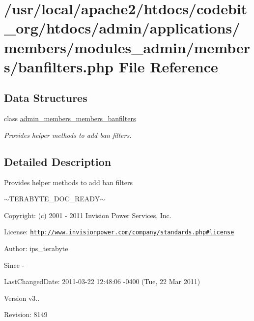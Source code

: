 \hypertarget{banfilters_8php}{\section{/usr/local/apache2/htdocs/codebit\-\_\-org/htdocs/admin/applications/members/modules\-\_\-admin/members/banfilters.php File Reference}
\label{banfilters_8php}
}
\subsection*{Data Structures}
\begin{DoxyCompactItemize}
\item 
class \hyperlink{classadmin__members__members__banfilters}{admin\-\_\-members\-\_\-members\-\_\-banfilters}
\begin{DoxyCompactList}\small\item\em Provides helper methods to add ban filters. \end{DoxyCompactList}\end{DoxyCompactItemize}


\subsection{Detailed Description}
\begin{DoxyVerb}  Provides helper methods to add ban filters
\end{DoxyVerb}
 $\sim$\-T\-E\-R\-A\-B\-Y\-T\-E\-\_\-\-D\-O\-C\-\_\-\-R\-E\-A\-D\-Y$\sim$ \begin{DoxyParagraph}{Copyright\-:}
(c) 2001 -\/ 2011 Invision Power Services, Inc.
\end{DoxyParagraph}
\begin{DoxyParagraph}{License\-:}
\href{http://www.invisionpower.com/company/standards.php#license}{\tt http\-://www.\-invisionpower.\-com/company/standards.\-php\#license}
\end{DoxyParagraph}
\begin{DoxyParagraph}{Author\-:}
ips\-\_\-terabyte 
\end{DoxyParagraph}
\begin{DoxySince}{Since}
-\/ 
\end{DoxySince}
\begin{DoxyParagraph}{Last\-Changed\-Date\-:}
2011-\/03-\/22 12\-:48\-:06 -\/0400 (Tue, 22 Mar 2011) 
\end{DoxyParagraph}
\begin{DoxyVersion}{Version}
v3.. 
\end{DoxyVersion}
\begin{DoxyParagraph}{Revision\-:}
8149 
\end{DoxyParagraph}
